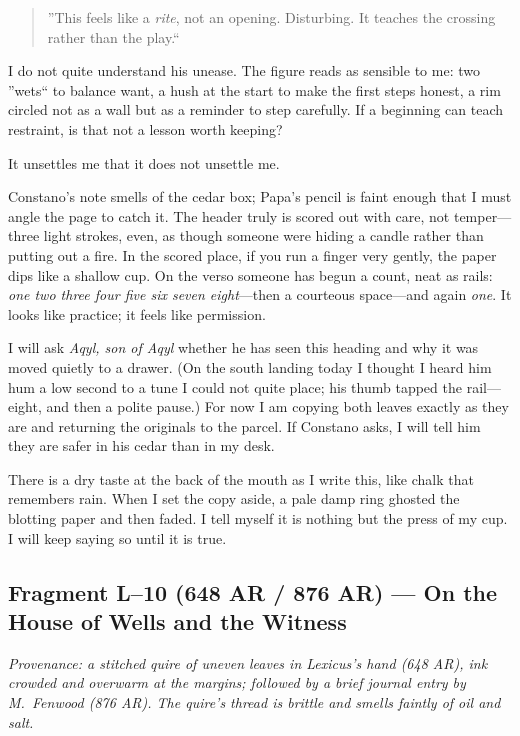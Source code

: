 \documentclass[11pt]{article}
\numberwithin{equation}{section} %
\theoremstyle{plain} %
\theoremstyle{definition} %
\theoremstyle{remark} %
\begin{document}
\begin{quote}\small
''This feels like a \emph{rite}, not an opening. Disturbing. It teaches the crossing rather than the play.``
\end{quote}

I do not quite understand his unease. The figure reads as sensible to me: two ''wets`` to balance want, a hush at the start to make the first steps honest, a rim circled not as a wall but as a reminder to step carefully. If a beginning can teach restraint, is that not a lesson worth keeping?

It unsettles me that it does not unsettle me.

Constano's note smells of the cedar box; Papa's pencil is faint enough that I must angle the page to catch it. The header truly is scored out with care, not temper---three light strokes, even, as though someone were hiding a candle rather than putting out a fire. In the scored place, if you run a finger very gently, the paper dips like a shallow cup. On the verso someone has begun a count, neat as rails: \emph{one two three four five six seven eight}---then a courteous space---and again \emph{one}. It looks like practice; it feels like permission.

I will ask \textit{Aqyl, son of Aqyl} whether he has seen this heading and why it was moved quietly to a drawer. (On the south landing today I thought I heard him hum a low second to a tune I could not quite place; his thumb tapped the rail---eight, and then a polite pause.) For now I am copying both leaves exactly as they are and returning the originals to the parcel. If Constano asks, I will tell him they are safer in his cedar than in my desk.

There is a dry taste at the back of the mouth as I write this, like chalk that remembers rain. When I set the copy aside, a pale damp ring ghosted the blotting paper and then faded. I tell myself it is nothing but the press of my cup. I will keep saying so until it is true.

\subsection{Fragment L--10 (648 AR / 876 AR) --- On the House of Wells and the Witness}
\label{frag:l10}

\noindent\textit{Provenance: a stitched quire of uneven leaves in Lexicus's hand (648 AR), ink crowded and overwarm at the margins; followed by a brief journal entry by M.\ Fenwood (876 AR). The quire's thread is brittle and smells faintly of oil and salt.}
\end{document}
